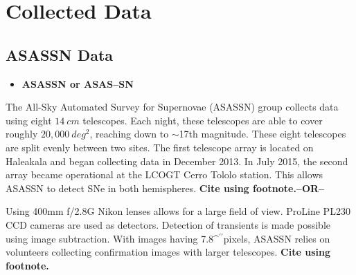 \documentclass[aps,prb,twocolumn,superscriptaddress]{revtex4-1}
\def\arcsec{\ifmmode^{\prime\prime}\else$^{\prime\prime}$\fi}
\begin{document}

\section{Collected Data}

\subsection{ASASSN Data}
\begin{itemize}
	\item{} {\bf ASASSN or ASAS--SN}
\end{itemize}


\indent The All-Sky Automated Survey for Supernovae (ASASSN) group 
collects data using eight $14~cm$ telescopes. Each night, these  
telescopes are able to cover roughly $20,000~deg^{2}$, reaching 
down to $\sim$17th magnitude.
These eight telescopes are split evenly between two sites.
The first telescope array is located on Haleakala and began 
collecting data in December 2013. In July 2015, the second %
array became operational at the LCOGT Cerro Tololo station. 
This allows ASASSN to detect SNe in both hemispheres.
{\bf Cite using footnote.--OR--~\cite{asn_data}}

\indent Using 400mm f/2.8G Nikon lenses allows for a large field of 
view. ProLine PL230 CCD cameras are used as detectors. Detection of 
transients is made possible using image subtraction. With images 
having 7.8\arcsec pixels, ASASSN relies on volunteers collecting  
confirmation images with larger telescopes.
{\bf Cite using footnote.}
\end{document}
